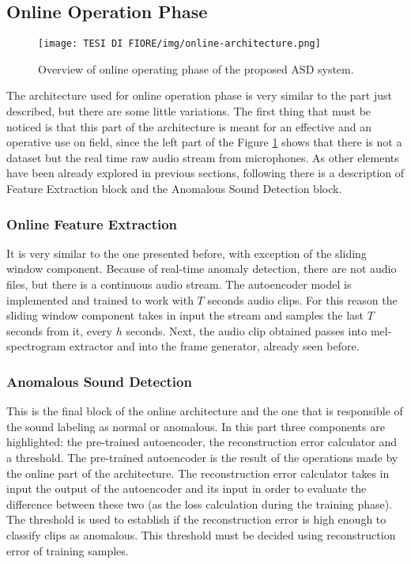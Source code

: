 \subsection{Online Operation Phase}
\begin{figure}[ht]
\texttt{[image: TESI DI FIORE/img/online-architecture.png]}
\centering
\caption{Overview of online operating phase of the proposed ASD system.}
\label{online-asd-system}
\end{figure}
The architecture used for online operation phase is very similar to the part just described, but there are some little variations. The first thing that must be noticed is that this part of the architecture is meant for an effective and an operative use on field, since the left part of the Figure \ref{online-asd-system} shows that there is not a dataset but the real time raw audio stream from microphones. As other elements have been already explored in previous sections, following  there is a description of Feature Extraction block and the Anomalous Sound Detection block. 

\subsubsection{Online Feature Extraction}
It is very similar to the one presented before, with exception of the sliding window component. Because of real-time anomaly detection, there are not audio files, but there is a continuous audio stream. The autoencoder model is implemented and trained to work with $T$ seconds audio clips. For this reason the sliding window component takes in input the stream and samples the last $T$ seconds from it, every $h$ seconds. Next, the audio clip obtained passes into mel-spectrogram extractor and into the frame generator, already seen before. 

\subsubsection{Anomalous Sound Detection}
This is the final block of the online architecture and the one that is responsible of the sound labeling as normal or anomalous. In this part three components are highlighted: the pre-trained autoencoder, the reconstruction error calculator and a threshold. The pre-trained autoencoder is the result of the operations made by the online part of the architecture. The reconstruction error calculator takes in input the output of the autoencoder and its input in order to evaluate the difference between these two (as the loss calculation during the training phase). The threshold is used to establish if the reconstruction error is high enough to classify clips as anomalous. This threshold must be decided using reconstruction error of training samples.


